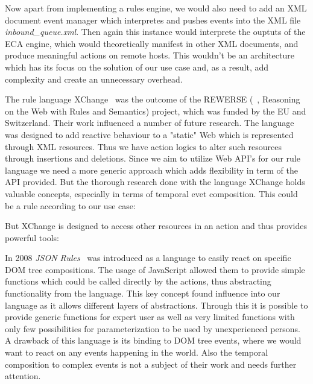 Now apart from implementing a rules engine, we would also need to add an XML document event manager which interpretes and pushes events into the XML file \emph{inbound\_queue.xml}. Then again this instance would interprete the ouptuts of the ECA engine, which would theoretically manifest in other XML documents, and produce meaningful actions on remote hosts. This wouldn't be an architecture which has its focus on the solution of our use case and, as a result, add complexity and create an unnecessary overhead.


The rule language XChange~\cite{2005-Patranjan-TLE.pdf} was the outcome of the REWERSE (~\cite{wwwRewerse}, Reasoning on the Web with Rules and Semantics) project, which was funded by the EU and Switzerland. Their work influenced a number of future research. The language was designed to add reactive behaviour to a "static" Web which is represented through XML resources. Thus we have action logics to alter such resources through insertions and deletions. Since we aim to utilize Web API's for our rule language we need a more generic approach which adds flexibility in term of the API provided. But the thorough research done with the language XChange holds valuable concepts, especially in terms of temporal evet composition. This could be a rule according to our use case:


But XChange is designed to access other resources in an action and thus provides powerful tools:

In 2008 \emph{JSON Rules}~\cite{2008-Giurca_Pascalau-JSON_Rules.pdf} was introduced as a language to easily react on specific DOM tree compositions.
The usage of JavaScript allowed them to provide simple functions which could be called directly by the actions, thus abstracting functionality from the language.
This key concept found influence into our language as it allows different layers of abstractions.
Through this it is possible to provide generic functions for expert user as well as very limited functions with only few possibilities for parameterization to be used by unexperienced persons.
A drawback of this language is its binding to DOM tree events, where we would want to react on any events happening in the world.
Also the temporal composition to complex events is not a subject of their work and needs further attention.


